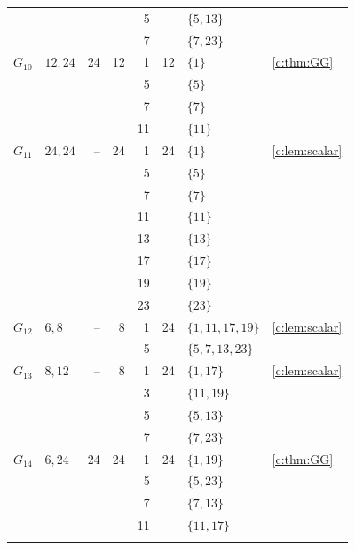 \documentclass[10pt,a4paper]{amsart}
\theoremstyle{definition}
\begin{document}
\begin{longtable}{@{}lL{.24\textwidth}rrrrL{.26\textwidth}L{.14\textwidth}@{}}
 &  &  &  & 5 &  & $\{5,\allowbreak 13\}$ &  \\*
 &  &  &  & 7 &  & $\{7,\allowbreak 23\}$ &  \\
\midrule[.25pt]
$G_{10}$ & $12,\allowbreak 24$ & 24 & 12 & 1 & 12 & $\{1\}$ & \cref{c:thm:GG} \\*
 &  &  &  & 5 &  & $\{5\}$ &  \\*
 &  &  &  & 7 &  & $\{7\}$ &  \\*
 &  &  &  & 11 &  & $\{11\}$ &  \\
\midrule[.25pt]
$G_{11}$ & $24,\allowbreak 24$ & -- & 24 & 1 & 24 & $\{1\}$ & \cref{c:lem:scalar} \\*
 &  &  &  & 5 &  & $\{5\}$ &  \\*
 &  &  &  & 7 &  & $\{7\}$ &  \\*
 &  &  &  & 11 &  & $\{11\}$ &  \\*
 &  &  &  & 13 &  & $\{13\}$ &  \\*
 &  &  &  & 17 &  & $\{17\}$ &  \\*
 &  &  &  & 19 &  & $\{19\}$ &  \\*
 &  &  &  & 23 &  & $\{23\}$ &  \\
\midrule[.25pt]
$G_{12}$ & $6,\allowbreak 8$ & -- & 8 & 1 & 24 & $\{1,\allowbreak 11,\allowbreak 17,\allowbreak 19\}$ & \cref{c:lem:scalar} \\*
 &  &  &  & 5 &  & $\{5,\allowbreak 7,\allowbreak 13,\allowbreak 23\}$ &  \\
\midrule[.25pt]
$G_{13}$ & $8,\allowbreak 12$ & -- & 8 & 1 & 24 & $\{1,\allowbreak 17\}$ & \cref{c:lem:scalar} \\*
 &  &  &  & 3 &  & $\{11,\allowbreak 19\}$ &  \\*
 &  &  &  & 5 &  & $\{5,\allowbreak 13\}$ &  \\*
 &  &  &  & 7 &  & $\{7,\allowbreak 23\}$ &  \\
\midrule[.25pt]
$G_{14}$ & $6,\allowbreak 24$ & 24 & 24 & 1 & 24 & $\{1,\allowbreak 19\}$ & \cref{c:thm:GG} \\*
 &  &  &  & 5 &  & $\{5,\allowbreak 23\}$ &  \\*
 &  &  &  & 7 &  & $\{7,\allowbreak 13\}$ &  \\*
 &  &  &  & 11 &  & $\{11,\allowbreak 17\}$ &  \\
\midrule[.25pt]

\end{longtable}
\end{document}
